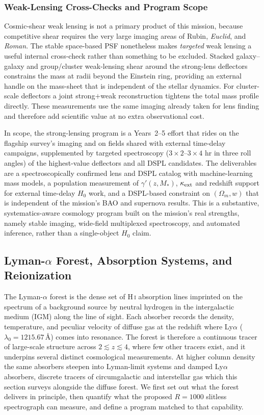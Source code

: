 \documentclass[10pt,onecolumn]{article}
\begin{document}
\subsubsection{Weak-Lensing Cross-Checks and Program Scope}

Cosmic-shear weak lensing is not a primary product of this mission, because competitive shear requires the very large imaging areas of Rubin, \textit{Euclid}, and \textit{Roman}. The stable space-based PSF nonetheless makes \emph{targeted} weak lensing a useful internal cross-check rather than something to be excluded. Stacked galaxy--galaxy and group/cluster weak-lensing shear around the strong-lens deflectors constrains the mass at radii beyond the Einstein ring, providing an external handle on the mass-sheet that is independent of the stellar dynamics. For cluster-scale deflectors a joint strong$+$weak reconstruction tightens the total mass profile directly. These measurements use the same imaging already taken for lens finding and therefore add scientific value at no extra observational cost.

In scope, the strong-lensing program is a Years~2--5 effort that rides on the flagship survey's imaging and on fields shared with external time-delay campaigns, supplemented by targeted spectroscopy ($3\times2$--$3\times4$ hr in three roll angles) of the highest-value deflectors and all DSPL candidates. The deliverables are a spectroscopically confirmed lens and DSPL catalog with machine-learning mass models, a population measurement of $\gamma'(z,M_\ast)$, $\kappa_{\rm ext}$ and redshift support for external time-delay $H_0$ work, and a DSPL-based constraint on $(\Omega_m,w)$ that is independent of the mission's BAO and supernova results. This is a substantive, systematics-aware cosmology program built on the mission's real strengths, namely stable imaging, wide-field multiplexed spectroscopy, and automated inference, rather than a single-object $H_0$ claim.

\subsection{Lyman-\texorpdfstring{$\alpha$}{alpha} Forest, Absorption Systems, and Reionization}\label{sec:lyaforest}

The Lyman-$\alpha$ forest is the dense set of H\,\textsc{i} absorption lines imprinted on the spectrum of a background source by neutral hydrogen in the intergalactic medium (IGM) along the line of sight. Each absorber records the density, temperature, and peculiar velocity of diffuse gas at the redshift where Ly$\alpha$ ($\lambda_0=1215.67$\,\AA) comes into resonance. The forest is therefore a continuous tracer of large-scale structure across $2\lesssim z\lesssim4$, where few other tracers exist, and it underpins several distinct cosmological measurements. At higher column density the same absorbers steepen into Lyman-limit systems and damped Ly$\alpha$ absorbers, discrete tracers of circumgalactic and interstellar gas which this section surveys alongside the diffuse forest. We first set out what the forest delivers in principle, then quantify what the proposed $R=1000$ slitless spectrograph can measure, and define a program matched to that capability.
\end{document}
